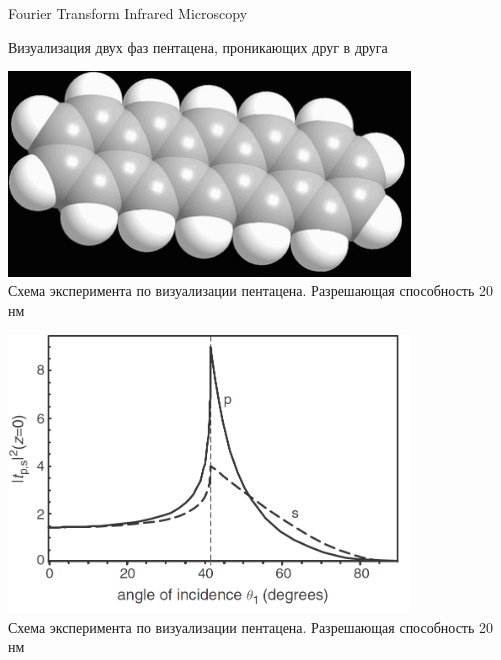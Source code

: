 \documentclass[9pt, compress, xcolor=table]{beamer}
\begin{document}
\begin{frame}{Fourier Transform Infrared Microscopy}

Визуализация двух фаз пентацена, проникающих друг в друга

\begin{center}
\includegraphics[width=0.8\textwidth]{pentacene}
\\Схема эксперимента по визуализации пентацена. Разрешающая способность 20 нм
\end{center}

    
\begin{center}
\includegraphics[width=0.8\textwidth]{ftir}
\\Схема эксперимента по визуализации пентацена. Разрешающая способность 20 нм
\end{center}
    
\end{frame}
\end{document}
